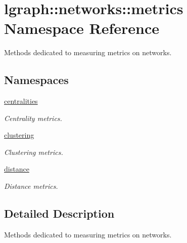 \hypertarget{namespacelgraph_1_1networks_1_1metrics}{\section{lgraph\-:\-:networks\-:\-:metrics Namespace Reference}
\label{namespacelgraph_1_1networks_1_1metrics}
}


Methods dedicated to measuring metrics on networks.  


\subsection*{Namespaces}
\begin{DoxyCompactItemize}
\item 
\hyperlink{namespacelgraph_1_1networks_1_1metrics_1_1centralities}{centralities}
\begin{DoxyCompactList}\small\item\em Centrality metrics. \end{DoxyCompactList}\item 
\hyperlink{namespacelgraph_1_1networks_1_1metrics_1_1clustering}{clustering}
\begin{DoxyCompactList}\small\item\em Clustering metrics. \end{DoxyCompactList}\item 
\hyperlink{namespacelgraph_1_1networks_1_1metrics_1_1distance}{distance}
\begin{DoxyCompactList}\small\item\em Distance metrics. \end{DoxyCompactList}\end{DoxyCompactItemize}


\subsection{Detailed Description}
Methods dedicated to measuring metrics on networks. 